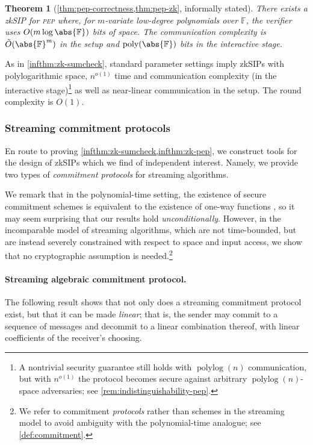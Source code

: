 \documentclass[a4paper,UKenglish,cleveref, autoref, thm-restate]{lipics-v2021}
\newtheorem{theorem}{Theorem}[section]
\theoremstyle{definition}
\newcommand{\zksip}{\textrm{zkSIP}}
\newcommand{\field}{\mathbb{F}}
\newcommand{\poly}{\operatorname{poly}}
\newcommand{\polylog}{\operatorname{polylog}}
\newcommand{\pep}{\normalfont\textsc{pep}\xspace}
\newcommand{\dimension}{m}
\begin{document}
\begin{theorem}[\cref{thm:pep-correctness,thm:pep-zk}, informally stated]
    \label{infthm:zk-pep}
    There exists a \zksip{} for \pep where, for $\dimension$-variate low-degree polynomials over $\field$, the verifier uses $O(\dimension \log \abs{\field})$ bits of space. The communication complexity is $\tilde O(\abs{\field}^\dimension)$ in the setup and $\poly(\abs{\field})$ bits in the interactive stage.
\end{theorem}
As in \cref{infthm:zk-sumcheck}, standard parameter settings imply \zksip{}s with polylogarithmic space, $n^{o(1)}$ time and communication complexity (in the interactive stage)\footnote{A nontrivial security guarantee still holds with $\polylog(n)$ communication, but with $n^{o(1)}$ the protocol becomes secure against arbitrary $\polylog(n)$-space adversaries; see \cref{rem:indistinguishability-pep}.} as well as near-linear communication in the setup. The round complexity is $O(1)$.

\subsubsection{Streaming commitment protocols}
En route to proving \cref{infthm:zk-sumcheck,infthm:zk-pep}, we construct tools for the design of \zksip{}s which we find of independent interest. Namely, we provide two types of \emph{commitment protocols} for streaming algorithms.

We remark that in the polynomial-time setting, the existence of secure commitment schemes is equivalent to the existence of one-way functions \cite{IL89, N91, HILL99}, so it may seem surprising that our results hold \emph{unconditionally}. However, in the incomparable model of streaming algorithms, which are not time-bounded, but are instead severely constrained with respect to space and input access, we show that no cryptographic assumption is needed.\footnote{We refer to commitment \emph{protocols} rather than schemes in the streaming model to avoid ambiguity with the polynomial-time analogue; see \cref{def:commitment}.}

\paragraph*{Streaming algebraic commitment protocol\iflipics\else.\fi}
The following result shows that not only does a streaming commitment protocol exist, but that it can be made \emph{linear}; that is, the sender may commit to a sequence of messages and decommit to a linear combination thereof, with linear coefficients of the receiver's choosing.
\end{document}
